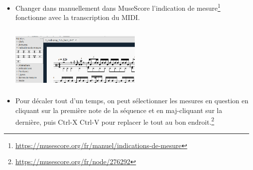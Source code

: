\begin{itemize}
	\item Changer dans manuellement dans MuseScore l’indication de mesure\footnote{\url{https://musescore.org/fr/manuel/indications-de-mesure}} fonctionne avec la transcription du MIDI. \\\\ \includegraphics[height=30mm, width=65mm]{images/transcriptions_manuelles/0_prise_en_main/0_tests_drummer_01__session3/solution_0.png} \\
	\item Pour décaler tout d’un temps, on peut sélectionner les mesures en question en cliquant sur la première note de la séquence et en maj-cliquant sur la dernière, puis Ctrl-X Ctrl-V pour replacer le tout au bon endroit.\footnote{\url{https://musescore.org/fr/node/276292}}\\
\end{itemize}

